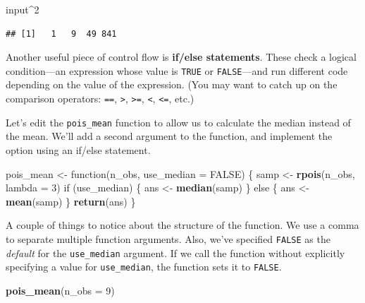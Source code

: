 \documentclass[12pt,oneside,openany]{tufte-book}
\newenvironment{Shaded}{}{}
\newcommand{\KeywordTok}[1]{\textcolor[rgb]{0.00,0.44,0.13}{\textbf{{#1}}}}
\newcommand{\DataTypeTok}[1]{\textcolor[rgb]{0.56,0.13,0.00}{{#1}}}
\newcommand{\DecValTok}[1]{\textcolor[rgb]{0.25,0.63,0.44}{{#1}}}
\newcommand{\StringTok}[1]{\textcolor[rgb]{0.25,0.44,0.63}{{#1}}}
\newcommand{\OtherTok}[1]{\textcolor[rgb]{0.00,0.44,0.13}{{#1}}}
\newcommand{\NormalTok}[1]{{#1}}
\begin{document}
\begin{Shaded}
\begin{Highlighting}[]
\NormalTok{input^}\DecValTok{2}
\end{Highlighting}
\end{Shaded}

\begin{verbatim}
## [1]   1   9  49 841
\end{verbatim}

Another useful piece of control flow is \textbf{if/else statements}.
These check a logical condition---an expression whose value is
\texttt{TRUE} or \texttt{FALSE}---and run different code depending on
the value of the expression. (You may want to catch up on the comparison
operators: \texttt{==}, \texttt{\textgreater{}},
\texttt{\textgreater{}=}, \texttt{\textless{}}, \texttt{\textless{}=},
etc.)

Let's edit the \texttt{pois\_mean} function to allow us to calculate the
median instead of the mean. We'll add a second argument to the function,
and implement the option using an if/else statement.

\begin{Shaded}
\begin{Highlighting}[]
\NormalTok{pois_mean <-}\StringTok{ }\NormalTok{function(n_obs, }\DataTypeTok{use_median =} \OtherTok{FALSE}\NormalTok{) \{}
    \NormalTok{samp <-}\StringTok{ }\KeywordTok{rpois}\NormalTok{(n_obs, }\DataTypeTok{lambda =} \DecValTok{3}\NormalTok{)}
    \NormalTok{if (use_median) \{}
        \NormalTok{ans <-}\StringTok{ }\KeywordTok{median}\NormalTok{(samp)}
    \NormalTok{\} else \{}
        \NormalTok{ans <-}\StringTok{ }\KeywordTok{mean}\NormalTok{(samp)}
    \NormalTok{\}}
    \KeywordTok{return}\NormalTok{(ans)}
\NormalTok{\}}
\end{Highlighting}
\end{Shaded}

A couple of things to notice about the structure of the function. We use
a comma to separate multiple function arguments. Also, we've specified
\texttt{FALSE} as the \emph{default} for the \texttt{use\_median}
argument. If we call the function without explicitly specifying a value
for \texttt{use\_median}, the function sets it to \texttt{FALSE}.

\begin{Shaded}
\begin{Highlighting}[]
\KeywordTok{pois_mean}\NormalTok{(}\DataTypeTok{n_obs =} \DecValTok{9}\NormalTok{)}
\end{Highlighting}
\end{Shaded}
\end{document}
